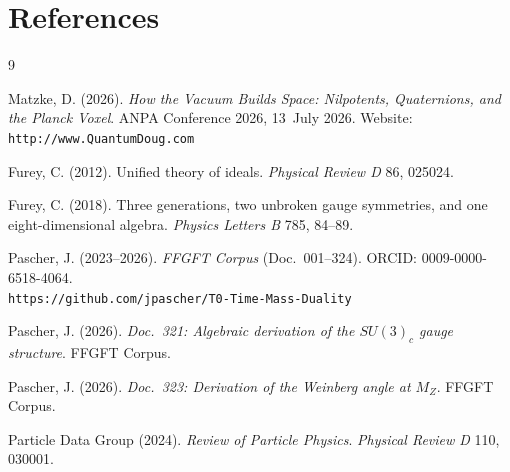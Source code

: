 \section*{References}

\begin{thebibliography}{9}

Matzke, D. (2026).
\textit{How the Vacuum Builds Space: Nilpotents, Quaternions,
and the Planck Voxel}.
ANPA Conference 2026, 13~July 2026.
Website: \texttt{http://www.QuantumDoug.com}

Furey, C. (2012).
Unified theory of ideals.
\textit{Physical Review D} 86, 025024.

Furey, C. (2018).
Three generations, two unbroken gauge symmetries, and
one eight-dimensional algebra.
\textit{Physics Letters B} 785, 84--89.

Pascher, J. (2023--2026).
\textit{FFGFT Corpus} (Doc.~001--324).
ORCID: 0009-0000-6518-4064.\\
\texttt{https://github.com/jpascher/T0-Time-Mass-Duality}

Pascher, J. (2026). \textit{Doc.~321: Algebraic derivation of the
$SU(3)_c$ gauge structure}. FFGFT Corpus.

Pascher, J. (2026). \textit{Doc.~323: Derivation of the Weinberg angle
at $M_Z$}. FFGFT Corpus.

Particle Data Group (2024). \textit{Review of Particle Physics}.
\textit{Physical Review D} 110, 030001.

\end{thebibliography}
